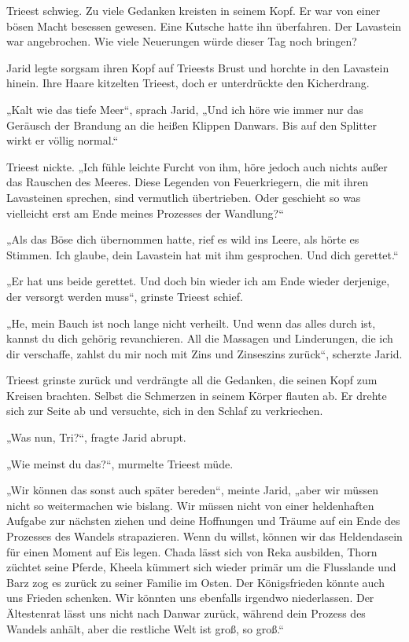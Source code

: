 Trieest schwieg. Zu viele Gedanken kreisten in seinem Kopf. Er war von einer bösen Macht besessen gewesen. Eine Kutsche hatte ihn überfahren. Der Lavastein war angebrochen. Wie viele Neuerungen würde dieser Tag noch bringen?

Jarid legte sorgsam ihren Kopf auf Trieests Brust und horchte in den Lavastein hinein. Ihre Haare kitzelten Trieest, doch er unterdrückte den Kicherdrang.

„Kalt wie das tiefe Meer“, sprach Jarid, „Und ich höre wie immer nur das Geräusch der Brandung an die heißen Klippen Danwars. Bis auf den Splitter wirkt er völlig normal.“

Trieest nickte. „Ich fühle leichte Furcht von ihm, höre jedoch auch nichts außer das Rauschen des Meeres. Diese Legenden von Feuerkriegern, die mit ihren Lavasteinen sprechen, sind vermutlich übertrieben. Oder geschieht so was vielleicht erst am Ende meines Prozesses der Wandlung?“

„Als das Böse dich übernommen hatte, rief es wild ins Leere, als hörte es Stimmen. Ich glaube, dein Lavastein hat mit ihm gesprochen. Und dich gerettet.“

„Er hat uns beide gerettet. Und doch bin wieder ich am Ende wieder derjenige, der versorgt werden muss“, grinste Trieest schief.

„He, mein Bauch ist noch lange nicht verheilt. Und wenn das alles durch ist, kannst du dich gehörig revanchieren. All die Massagen und Linderungen, die ich dir verschaffe, zahlst du mir noch mit Zins und Zinseszins zurück“, scherzte Jarid.

Trieest grinste zurück und verdrängte all die Gedanken, die seinen Kopf zum Kreisen brachten. Selbst die Schmerzen in seinem Körper flauten ab. Er drehte sich zur Seite ab und versuchte, sich in den Schlaf zu verkriechen.

„Was nun, Tri?“, fragte Jarid abrupt.

„Wie meinst du das?“, murmelte Trieest müde.

„Wir können das sonst auch später bereden“, meinte Jarid, „aber wir müssen nicht so weitermachen wie bislang. Wir müssen nicht von einer heldenhaften Aufgabe zur nächsten ziehen und deine Hoffnungen und Träume auf ein Ende des Prozesses des Wandels strapazieren. Wenn du willst, können wir das Heldendasein für einen Moment auf Eis legen. Chada lässt sich von Reka ausbilden, Thorn züchtet seine Pferde, Kheela kümmert sich wieder primär um die Flusslande und Barz zog es zurück zu seiner Familie im Osten. Der Königsfrieden könnte auch uns Frieden schenken. Wir könnten uns ebenfalls irgendwo niederlassen. Der Ältestenrat lässt uns nicht nach Danwar zurück, während dein Prozess des Wandels anhält, aber die restliche Welt ist groß, so groß.“

